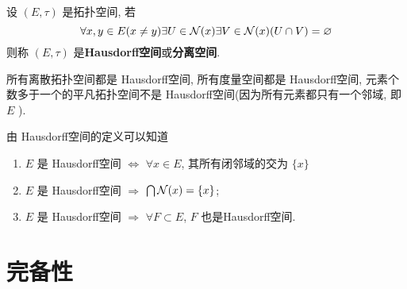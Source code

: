  \begin{Def}[Hausdorff空间]\label{def:Hausdorff空间}
       设 $ (E, \tau) $ 是拓扑空间, 若 
       \[
          \forall x, y\in E(x\neq y)\exists U\in \mathcal{N}(x)\exists V\in\mathcal{N}(x) (U\cap V)=\varnothing
       \]
       则称 $ (E, \tau) $ 是\textbf{Hausdorff空间}或\textbf{分离空间}. 
 \end{Def}
 \begin{Ex}
      所有离散拓扑空间都是 Hausdorff空间, 所有度量空间都是 Hausdorff空间, 元素个数多于一个的平凡拓扑空间不是 Hausdorff空间(因为所有元素都只有一个邻域, 即 $ E $ ). 
 \end{Ex}
 \begin{Prop}
     由 Hausdorff空间的定义可以知道
      \begin{enumerate}[(1)]
           \item  $ E $ 是 Hausdorff空间 $ \Longleftrightarrow $ $ \forall x\in E $, 其所有闭邻域的交为 $\{ x \}$
           \item $ E $ 是 Hausdorff空间 $ \Longrightarrow $ $\bigcap \mathcal{N}(x)=\{x\}$;
           \item $ E $ 是 Hausdorff空间 $ \Longrightarrow $ $ \forall F\subset E $, $ F $ 也是Hausdorff空间. 
      \end{enumerate}
 \end{Prop}
 
 \section{完备性}
